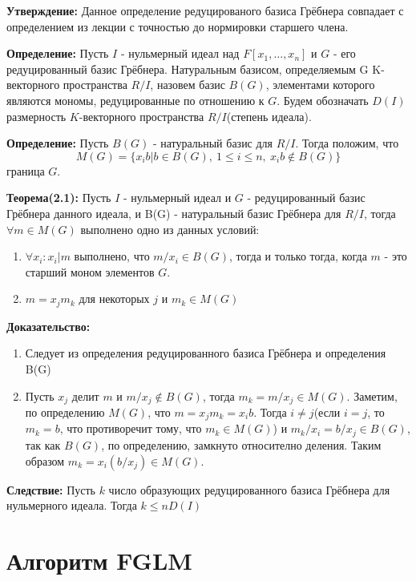 \documentclass{article}
\begin{document}
    \textbf{Утверждение:} Данное определение редуцированого базиса Грёбнера совпадает с 
    определением из лекции с точностью до нормировки старшего члена.  
     
    \textbf{Определение:} Пусть $I$ - нульмерный идеал над $F[x_1,\ldots,x_n]$ и $G$ - его редуцированный базис Грёбнера.
    Натуральным базисом, определяемым G K-векторного пространства $R/I$, назовем базис $B(G)$, элементами которого являются мономы, редуцированные
    по отношению к $G$. Будем обозначать $D(I)$ размерность $K$-векторного пространства $R/I$(степень идеала).

    \textbf{Определение:} Пусть $B(G)$ - натуральный базис для $R/I$. Тогда положим, что
    $$M(G) = \{x_ib | b \in B(G),\: 1\leq i \leq n,\: x_ib \notin B(G)\}$$ граница $G$.

    \textbf{Теорема(2.1):} Пусть $I$ - нульмерный идеал и $G$ - редуцированный базис Грёбнера данного идеала, и
    B(G) - натуральный базис Грёбнера для $R/I$, тогда $\forall m \in M(G)$ выполнено одно из данных условий:

    \begin{enumerate}
        \item $\forall x_i : x_i | m$ выполнено, что $m/x_i \in B(G)$, тогда и только тогда, когда $m$ - это старший моном элементов $G$.
        \item $m = x_jm_k$ для некоторых $j$ и $m_k \in M(G)$
    \end{enumerate}

    \textbf{Доказательство:}
    \begin{enumerate}
        \item Следует из определения редуцированного базиса Грёбнера и определения B(G)
        \item Пусть $x_j$ делит $m$ и $m/x_j \notin B(G)$, тогда $m_k = m/x_j \in M(G)$. Заметим, по определению $M(G)$, что
        $m=x_jm_k=x_ib$. Тогда $i \not= j$(если $i=j$, то $m_k=b$, что противоречит тому, что $m_k \in M(G)$) и $m_k/x_i=b/x_j\in B(G)$, так как $B(G)$, по определению, замкнуто относително деления.
        Таким образом $m_k=x_i(b/x_j)\in M(G)$.
    \end{enumerate}

    \textbf{Следствие:} Пусть $k$ число образующих редуцированного базиса Грёбнера для нульмерного идеала.
        Тогда $k \leq nD(I)$
    
    \newpage    

\section{Алгоритм FGLM}
\end{document}
